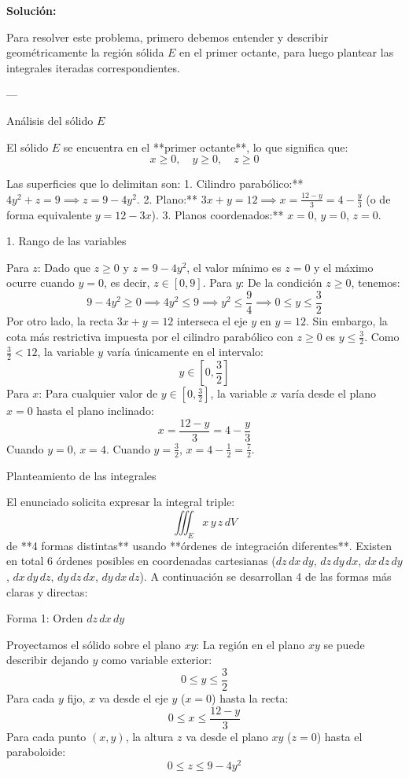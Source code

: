 \documentclass[12pt,a4paper]{report}
\newcommand{\solutionname}{Solución:}
\newenvironment{solution}{
 	\par\noindent\textbf{\color{structurecolor}\solutionname}
 	\color{black!90}}{\hfill\quad\par}
\begin{document}
\begin{solution}

	Para resolver este problema, primero debemos entender y describir geométricamente la región sólida $E$ en el primer octante, para luego plantear las integrales iteradas correspondientes.

---

 Análisis del sólido $E$

El sólido $E$ se encuentra en el **primer octante**, lo que significa que:
$$x \ge 0, \quad y \ge 0, \quad z \ge 0$$

Las superficies que lo delimitan son:
1. Cilindro parabólico:** $4y^2 + z = 9 \implies z = 9 - 4y^2$.
2. Plano:** $3x + y = 12 \implies x = \frac{12 - y}{3} = 4 - \frac{y}{3}$ (o de forma equivalente $y = 12 - 3x$).
3. Planos coordenados:** $x = 0$, $y = 0$, $z = 0$.

 1. Rango de las variables

 Para $z$: Dado que $z \ge 0$ y $z = 9 - 4y^2$, el valor mínimo es $z = 0$ y el máximo ocurre cuando $y = 0$, es decir, $z \in [0, 9]$.
 Para $y$:
  De la condición $z \ge 0$, tenemos:
    $$9 - 4y^2 \ge 0 \implies 4y^2 \le 9 \implies y^2 \le \frac{9}{4} \implies 0 \le y \le \frac{3}{2}$$
   Por otro lado, la recta $3x + y = 12$ interseca el eje $y$ en $y = 12$. Sin embargo, la cota más restrictiva impuesta por el cilindro parabólico con $z \ge 0$ es $y \le \frac{3}{2}$.
   Como $\frac{3}{2} < 12$, la variable $y$ varía únicamente en el intervalo:
    $$y \in \left[0, \frac{3}{2}\right]$$
 Para $x$:
   Para cualquier valor de $y \in \left[0, \frac{3}{2}\right]$, la variable $x$ varía desde el plano $x = 0$ hasta el plano inclinado:
    $$x = \frac{12 - y}{3} = 4 - \frac{y}{3}$$
   Cuando $y = 0$, $x = 4$.
   Cuando $y = \frac{3}{2}$, $x = 4 - \frac{1}{2} = \frac{7}{2}$.



 Planteamiento de las integrales

El enunciado solicita expresar la integral triple:
$$\iiint_E x\,y\,z\,dV$$
de **4 formas distintas** usando **órdenes de integración diferentes**. Existen en total 6 órdenes posibles en coordenadas cartesianas ($dz\,dx\,dy$, $dz\,dy\,dx$, $dx\,dz\,dy$, $dx\,dy\,dz$, $dy\,dz\,dx$, $dy\,dx\,dz$). A continuación se desarrollan 4 de las formas más claras y directas:


 Forma 1: Orden $dz\,dx\,dy$

Proyectamos el sólido sobre el plano $xy$:
 La región en el plano $xy$ se puede describir dejando $y$ como variable exterior:
  $$0 \le y \le \frac{3}{2}$$
 Para cada $y$ fijo, $x$ va desde el eje $y$ ($x = 0$) hasta la recta:
  $$0 \le x \le \frac{12 - y}{3}$$
 Para cada punto $(x, y)$, la altura $z$ va desde el plano $xy$ ($z = 0$) hasta el paraboloide:
  $$0 \le z \le 9 - 4y^2$$


\end{solution}
\end{document}

